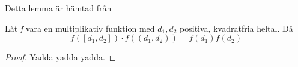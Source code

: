 Detta lemma är hämtad från \cite[Sats 1.2.3]{cojocarumurty}
\begin{theorem}\label{APDX:mobDual}
Låt \textit{f} vara en multiplikativ funktion med \(d_1,d_2\) positiva, kvadratfria heltal. Då
\begin{equation}
    f([d_1,d_2])\cdot f((d_1, d_2)) = f(d_1)f(d_2)\nonumber
\end{equation}
\end{theorem}
\begin{proof}
Yadda yadda yadda.
\end{proof}